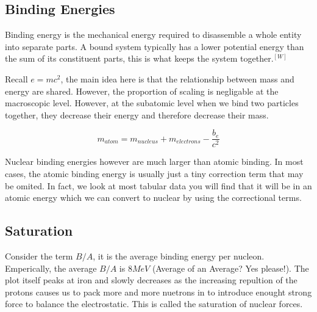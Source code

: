 \documentclass[english, 11pt]{article}
\begin{document}
      \subsection{Binding Energies}

      \begin{defn}\label{be}
        Binding energy is the mechanical energy required to disassemble a whole entity into separate parts. A bound system typically has a lower potential energy than the sum of its constituent parts, this is what keeps the system together.$^{[W]}$ 
      \end{defn}

      Recall $e=mc^2$, the main idea here is that the relationship between mass and energy are shared. However, the proportion of scaling is negligable at the macroscopic level. However, at the subatomic level when we bind two particles together, they decrease their energy and therefore decrease their mass. 

      \begin{exmp}
        \[  m_{atom} = m_{nucleus} + m_{electrons} - \frac{b_{e}}{c^2} \]
      \end{exmp}
      
      Nuclear binding energies however are much larger than atomic binding. In most cases, the atomic binding energy is usually just a tiny correction term that may be omited. In fact, we look at most tabular data you will find that it will be in an atomic energy which we can convert to nuclear by using the correctional terms.\\

      \subsection{Saturation}

      Consider the term $B/A$, it is the average binding energy per nucleon. Emperically, the average $B/A$ is $8 MeV$ (Average of an Average? Yes please!). The plot itself peaks at iron and slowly decreases as the increasing repultion of the protons causes us to pack more and more nuetrons in to introduce enought strong force to balance the electrostatic. This is called the saturation of nuclear forces. 
\end{document}
